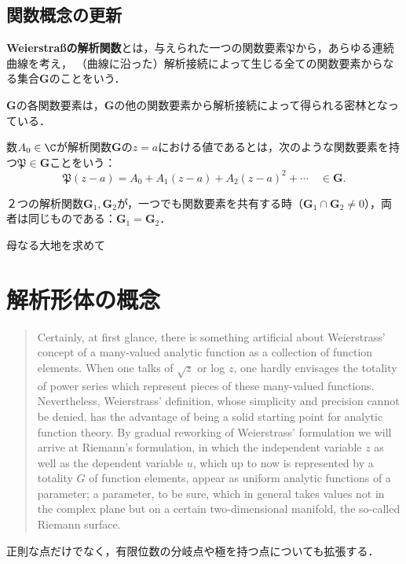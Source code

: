 \documentclass[uplatex, dvipdfmx]{jsreport}
\newcommand{\frakP}{\mathfrak{P}}
\renewcommand{\G}{\mathbf{G}}
\begin{document}
\subsection{関数概念の更新}

\begin{definition}
    \textbf{Weierstraßの解析関数}とは，与えられた一つの関数要素$\mathfrak{P}$から，あらゆる連続曲線を考え，
    （曲線に沿った）解析接続によって生じる全ての関数要素からなる集合$\mathbf{G}$のことをいう．
\end{definition}
\begin{remark}
    $\mathbf{G}$の各関数要素は，$\mathbf{G}$の他の関数要素から解析接続によって得られる密林となっている．
\end{remark}

\begin{definition}[value]
    数$A_0\in\C$が解析関数$\G$の$z=a$における値であるとは，次のような関数要素を持つ$\frakP\in\G$ことをいう：
    \[\frakP(z-a)=A_0+A_1(z-a)+A_2(z-a)^2+\cdots\quad\in\G.\]
\end{definition}

\begin{proposition}[極大性]
    ２つの解析関数$\mathbf{G}_1,\G_2$が，一つでも関数要素を共有する時（$\G_1\cap\G_2\ne 0$），両者は同じものである：$\G_1=\G_2$．
\end{proposition}

\begin{itembox}[l]{母なる大地を求めて}
    
\end{itembox}

\section{解析形体の概念}

\begin{screen}
    \begin{quote}
        Certainly, at first glance, there is something artificial about Weierstrass' concept of a many-valued analytic function as a collection of function elements.
        When one talks of $\sqrt{z}$ or log $z$, one hardly envisages the totality of power series which represent pieces of these many-valued functions.
        Nevertheless, Weierstrass' definition, whose simplicity and precision cannot be denied, has the advantage of being a solid starting point for analytic function theory.
        By gradual reworking of Weierstrass' formulation we will arrive at Riemann's formulation, in which the independent variable $z$ as well as the dependent variable $u$, which up to now is represented by a totality $G$ of function elements, appear as uniform analytic functions of a parameter; a parameter, to be sure, which in general takes values not in the complex plane but on a certain two-dimensional manifold, the so-called Riemann surface.
    \end{quote}
    正則な点だけでなく，有限位数の分岐点や極を持つ点についても拡張する．
\end{screen}
\end{document}
